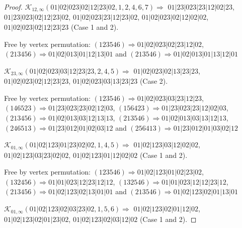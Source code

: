\documentclass[12pt]{article}
\theoremstyle{plain}
\theoremstyle{definition}
\theoremstyle{remark}
\newcommand{\fancy}[1]{\mathcal{#1}}
\def\K{\fancy{K}}
\begin{document}
\begin{proof}
	
	\bigskip
	
	$\K_{12,\infty}(01|02|023|02|12|23|02,1, 2, 4, 6, 7)\Rightarrow $ $01|23|023|23|12|02|23$, $01|23|023|02|12|23|02$, $01|02|023|23|12|23|02$, $01|02|023|02|12|02|02$, $01|02|023|02|12|23|23$ (Case 1 and 2).
	
	
	
	Free by vertex permutation: $(1 2 3 5 4 6)\Rightarrow 01|02|023|02|23|12|02$, $(2 1 3 4 5 6)\Rightarrow 01|02|013|01|12|13|01$ and $(2 1 3 5 4 6)\Rightarrow 01|02|013|01|13|12|01$
	
	
	\bigskip
	
	$\K_{23,\infty}(01|02|023|03|12|23|23,2, 4, 5)\Rightarrow $ $01|02|023|02|13|23|23$, $01|02|023|02|12|23|23$, $01|02|023|03|13|23|23$ (Case 2).
	
	
	
	Free by vertex permutation: $(1 2 3 5 4 6)\Rightarrow 01|02|023|03|23|12|23$, $(1 4 6 5 2 3)\Rightarrow 01|23|023|23|02|12|03$, $(1 5 6 4 2 3)\Rightarrow 01|23|023|23|12|02|03$, $(2 1 3 4 5 6)\Rightarrow 01|02|013|03|12|13|13$, $(2 1 3 5 4 6)\Rightarrow 01|02|013|03|13|12|13$, $(2 4 6 5 1 3)\Rightarrow 01|23|012|01|02|03|12$ and $(2 5 6 4 1 3)\Rightarrow 01|23|012|01|03|02|12$
	
	
	\bigskip
	
	$\K_{01,\infty}(01|02|123|01|23|02|02,1, 4, 5)\Rightarrow $ $01|02|123|03|12|02|02$, $01|02|123|03|23|02|02$, $01|02|123|01|12|02|02$ (Case 1 and 2).
	
	
	
	Free by vertex permutation: $(1 2 3 5 4 6)\Rightarrow 01|02|123|01|02|23|02$, $(1 3 2 4 5 6)\Rightarrow 01|01|023|12|23|12|12$, $(1 3 2 5 4 6)\Rightarrow 01|01|023|12|12|23|12$, $(2 1 3 4 5 6)\Rightarrow 01|02|123|02|13|01|01$ and $(2 1 3 5 4 6)\Rightarrow 01|02|123|02|01|13|01$
	
	
	\bigskip
	
	$\K_{01,\infty}(01|02|123|02|03|23|02,1, 5, 6)\Rightarrow $ $01|02|123|02|01|12|02$, $01|02|123|02|01|23|02$, $01|02|123|02|03|12|02$ (Case 1 and 2).
	
	
	

\end{proof}
\end{document}
